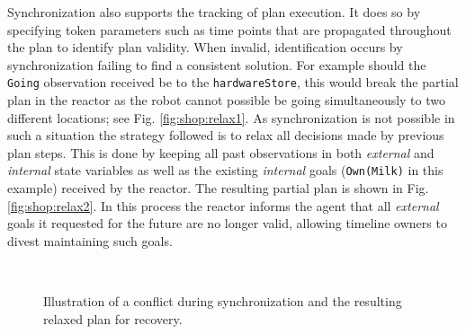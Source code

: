 
Synchronization also supports the tracking of plan execution. It does
so by specifying token parameters such as time points that are
propagated throughout the plan to identify plan validity.
When invalid, identification occurs by synchronization failing to find
a consistent solution. For example should the \texttt{Going}
observation received be to the \texttt{hardwareStore}, this would
break the partial plan in the reactor as the robot cannot possible be
going simultaneously to two different locations; see Fig.
\ref{fig:shop:relax1}. As synchronization is not possible in such a
situation the strategy followed is to relax all decisions made by
previous plan steps. This is done by keeping all past observations in
both {\em external} and {\em internal} state variables as well as the
existing {\em internal} goals (\texttt{Own(Milk)} in this example)
received by the reactor. The resulting partial plan is shown in Fig.
\ref{fig:shop:relax2}. In this process the reactor informs the agent
that all {\em external} goals it requested for the future are no
longer valid, allowing timeline owners to divest maintaining such
goals.

\begin{figure}[!htbp]
  \centering
  \\
  \caption{\small Illustration of a conflict during synchronization
    and the resulting relaxed plan for recovery.}
\end{figure}

